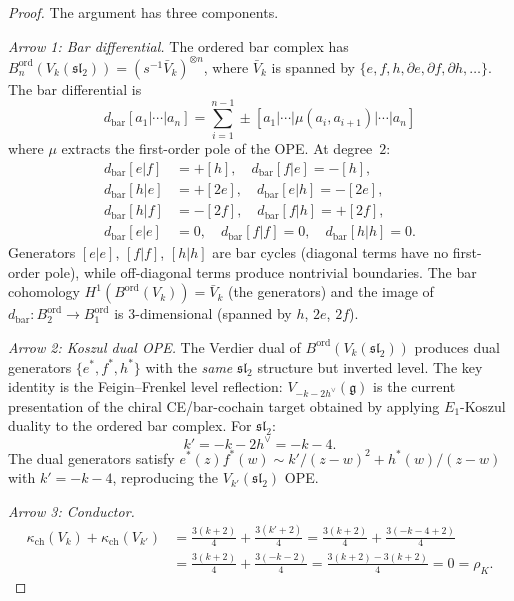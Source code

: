 \begin{proof}
The argument has three components.

\emph{Arrow 1: Bar differential.}
The ordered bar complex has $B^{\mathrm{ord}}_n(V_k(\mathfrak{sl}_2)) =
(s^{-1}\bar{V}_k)^{\otimes n}$, where $\bar{V}_k$ is spanned by
$\{e, f, h, \partial e, \partial f, \partial h, \ldots\}$. The bar
differential is
\[
 d_{\mathrm{bar}}[a_1|\cdots|a_n] = \sum_{i=1}^{n-1} \pm
 [a_1|\cdots|\mu(a_i, a_{i+1})|\cdots|a_n]
\]
where $\mu$ extracts the first-order pole of the OPE. At degree~$2$:
\begin{align*}
 d_{\mathrm{bar}}[e|f] &= +[h], \quad
 d_{\mathrm{bar}}[f|e] = -[h], \\
 d_{\mathrm{bar}}[h|e] &= +[2e], \quad
 d_{\mathrm{bar}}[e|h] = -[2e], \\
 d_{\mathrm{bar}}[h|f] &= -[2f], \quad
 d_{\mathrm{bar}}[f|h] = +[2f], \\
 d_{\mathrm{bar}}[e|e] &= 0, \quad
 d_{\mathrm{bar}}[f|f] = 0, \quad
 d_{\mathrm{bar}}[h|h] = 0.
\end{align*}
Generators $[e|e]$, $[f|f]$, $[h|h]$ are bar cycles (diagonal terms have
no first-order pole), while off-diagonal terms produce nontrivial
boundaries. The bar cohomology
$H^1(B^{\mathrm{ord}}(V_k)) = \bar{V}_k$ (the generators) and the image
of $d_{\mathrm{bar}}\colon B^{\mathrm{ord}}_2 \to B^{\mathrm{ord}}_1$
is $3$-dimensional (spanned by $h$, $2e$, $2f$).

\emph{Arrow 2: Koszul dual OPE.}
The Verdier dual of $B^{\mathrm{ord}}(V_k(\mathfrak{sl}_2))$ produces
dual generators $\{e^*, f^*, h^*\}$ with the \emph{same}
$\mathfrak{sl}_2$ structure but inverted level. The key identity is the
Feigin--Frenkel level reflection:
$V_{-k-2h^\vee}(\mathfrak{g})$ is the current presentation of the
chiral CE/bar-cochain target obtained by applying $E_1$-Koszul duality
to the ordered bar complex. For $\mathfrak{sl}_2$:
\[
 k' = -k - 2h^\vee = -k - 4.
\]
The dual generators satisfy $e^*(z)f^*(w) \sim k'/(z-w)^2 + h^*(w)/(z-w)$
with $k' = -k-4$, reproducing the $V_{k'}(\mathfrak{sl}_2)$ OPE.

\emph{Arrow 3: Conductor.}
\begin{align*}
 \kappa_{\mathrm{ch}}(V_k) + \kappa_{\mathrm{ch}}(V_{k'})
 &= \frac{3(k+2)}{4} + \frac{3(k'+2)}{4}
 = \frac{3(k+2)}{4} + \frac{3(-k-4+2)}{4} \\
 &= \frac{3(k+2)}{4} + \frac{3(-k-2)}{4}
 = \frac{3(k+2) - 3(k+2)}{4} = 0 = \rho_K.
\end{align*}
\end{proof}

